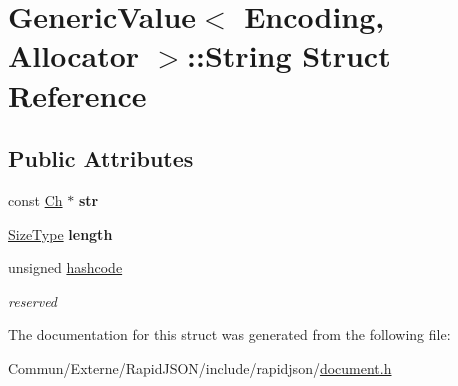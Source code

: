 \hypertarget{struct_generic_value_1_1_string}{}\section{Generic\+Value$<$ Encoding, Allocator $>$\+:\+:String Struct Reference}
\label{struct_generic_value_1_1_string}
\subsection*{Public Attributes}
\begin{DoxyCompactItemize}
\item 
const \hyperlink{class_generic_value_ade0e0ce64ccd5d852da57a35e720bafb}{Ch} $\ast$ {\bfseries str}\hypertarget{struct_generic_value_1_1_string_a4eebc5acf3f93ab833efd82abf3ba84d}{}\label{struct_generic_value_1_1_string_a4eebc5acf3f93ab833efd82abf3ba84d}

\item 
\hyperlink{rapidjson_8h_a5ed6e6e67250fadbd041127e6386dcb5}{Size\+Type} {\bfseries length}\hypertarget{struct_generic_value_1_1_string_ad6ffab0e093aa8db6e415812ff6443bf}{}\label{struct_generic_value_1_1_string_ad6ffab0e093aa8db6e415812ff6443bf}

\item 
unsigned \hyperlink{struct_generic_value_1_1_string_a3f1da673591f850e425184f2d8495d66}{hashcode}\hypertarget{struct_generic_value_1_1_string_a3f1da673591f850e425184f2d8495d66}{}\label{struct_generic_value_1_1_string_a3f1da673591f850e425184f2d8495d66}

\begin{DoxyCompactList}\small\item\em reserved \end{DoxyCompactList}\end{DoxyCompactItemize}


The documentation for this struct was generated from the following file\+:\begin{DoxyCompactItemize}
\item 
Commun/\+Externe/\+Rapid\+J\+S\+O\+N/include/rapidjson/\hyperlink{document_8h}{document.\+h}\end{DoxyCompactItemize}
